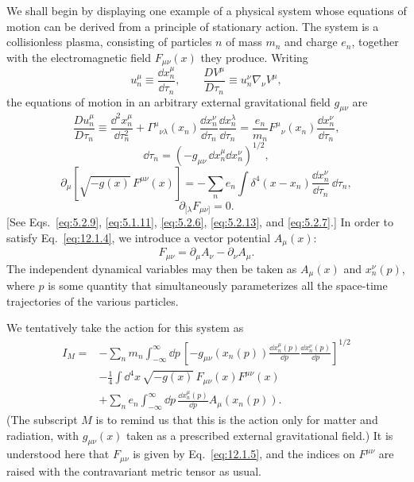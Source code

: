 We shall begin by displaying one example of a physical system whose equations
of motion can be derived from a principle of stationary action. The system is
a collisionless plasma, consisting of particles \(n\) of mass \(m_n\) and
charge \(e_n\), together with the electromagnetic field \(F_{\mu\nu}(x)\)
they produce. Writing
\[
  u_n^\mu\equiv\frac{\dd x_n^\mu}{\dd\tau_n},
  \qquad
  \frac{D V^\mu}{D\tau_n}\equiv u_n^\nu\nabla_\nu V^\mu,
\]
the equations of motion in an arbitrary external gravitational field
\(g_{\mu\nu}\) are
\begin{equation}
  \frac{D u_n^\mu}{D\tau_n}
  \equiv
  \frac{\dd^2x_n^\mu}{\dd\tau_n^2}
  +\Gamma^\mu{}_{\nu\lambda}(x_n)
   \frac{\dd x_n^\nu}{\dd\tau_n}
   \frac{\dd x_n^\lambda}{\dd\tau_n}
  =
  \frac{e_n}{m_n}F^\mu{}_\nu(x_n)
  \frac{\dd x_n^\nu}{\dd\tau_n},
  \tag{12.1.1}\label{eq:12.1.1}
\end{equation}
\begin{equation}
  \dd\tau_n
  =
  \left(-g_{\mu\nu}\,\dd x_n^\mu\dd x_n^\nu\right)^{1/2},
  \tag{12.1.2}\label{eq:12.1.2}
\end{equation}
\begin{equation}
  \partial_\mu\!\left[\sqrt{-g(x)}\,F^{\mu\nu}(x)\right]
  =
  -\sum_n e_n
   \int
   \delta^4(x-x_n)
   \frac{\dd x_n^\nu}{\dd\tau_n}\,\dd\tau_n,
  \tag{12.1.3}\label{eq:12.1.3}
\end{equation}
\begin{equation}
  \partial_{[\lambda}F_{\mu\nu]}=0.
  \tag{12.1.4}\label{eq:12.1.4}
\end{equation}
[See Eqs.~\eqref{eq:5.2.9}, \eqref{eq:5.1.11}, \eqref{eq:5.2.6},
\eqref{eq:5.2.13}, and \eqref{eq:5.2.7}.] In order to satisfy
Eq.~\eqref{eq:12.1.4}, we introduce a vector potential \(A_\mu(x)\):
\begin{equation}
  F_{\mu\nu}
  =
  \partial_\mu A_\nu-\partial_\nu A_\mu.
  \tag{12.1.5}\label{eq:12.1.5}
\end{equation}
The independent dynamical variables may then be taken as \(A_\mu(x)\) and
\(x_n^\nu(p)\), where \(p\) is some quantity that simultaneously
parameterizes all the space-time trajectories of the various particles.

We tentatively take the action for this system as
\begin{equation}
  \begin{aligned}
  I_M={}&
  -\sum_n m_n\int_{-\infty}^{\infty}\dd p\,
   \left[
     -g_{\mu\nu}(x_n(p))
      \frac{\dd x_n^\mu(p)}{\dd p}
      \frac{\dd x_n^\nu(p)}{\dd p}
   \right]^{1/2}
  \\
  &-\frac14\int\dd^4x\,\sqrt{-g(x)}\,
    F_{\mu\nu}(x)F^{\mu\nu}(x)
  \\
  &+\sum_n e_n\int_{-\infty}^{\infty}\dd p\,
    \frac{\dd x_n^\mu(p)}{\dd p}A_\mu(x_n(p)).
  \end{aligned}
  \tag{12.1.6}\label{eq:12.1.6}
\end{equation}
(The subscript \(M\) is to remind us that this is the action only for matter
and radiation, with \(g_{\mu\nu}(x)\) taken as a prescribed external
gravitational field.) It is understood here that \(F_{\mu\nu}\) is given by
Eq.~\eqref{eq:12.1.5}, and the indices on \(F^{\mu\nu}\) are raised with the
contravariant metric tensor as usual.

